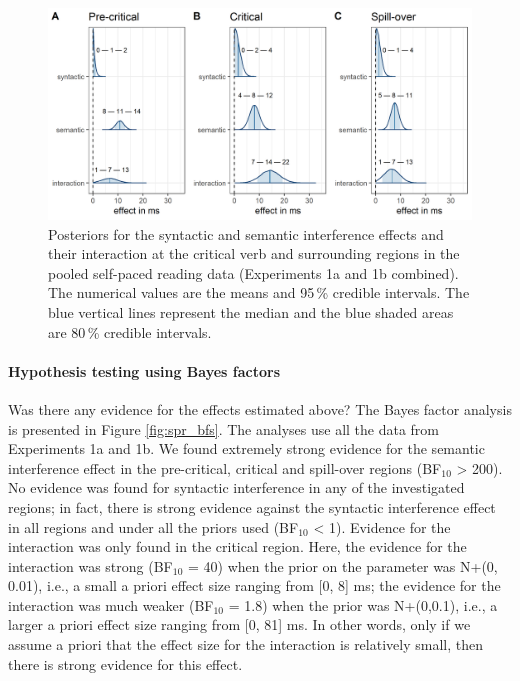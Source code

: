 \documentclass[a4paper, man, floatsintext]{apa7}
\begin{document}
\begin{figure}[H]
    \caption{Posteriors for the syntactic and semantic interference effects and their interaction at the critical verb and surrounding regions in the pooled self-paced reading data (Experiments 1a and 1b combined). The numerical values are the means and 95\,\% credible intervals. The blue vertical lines represent the median and the blue shaded areas are 80\,\% credible intervals.}
    \label{fig:spr_posteriors}
    \centering
    \includegraphics[width=\textwidth]{images/posteriors_spr_pooled_774.png}
\end{figure}

\paragraph{Hypothesis testing using Bayes factors}

Was there any evidence for the effects estimated above? The Bayes factor analysis is presented in Figure \ref{fig:spr_bfs}. The analyses use all the data from Experiments 1a and 1b. We found extremely strong evidence for the semantic interference effect in the pre-critical, critical and spill-over regions (BF$_{10}$ > 200). No evidence was found for syntactic interference in any of the investigated regions; in fact, there is strong evidence against the syntactic interference effect in all regions and under all the priors used (BF$_{10}$ < 1). Evidence for the interaction was only found in the critical region. Here, the evidence for the interaction was strong (BF$_{10}$ = 40) when the prior on the parameter was N+(0, 0.01), i.e., a small a priori effect size ranging from  [0, 8] ms; the evidence for the interaction was much weaker (BF$_{10}$ = 1.8) when the prior was N+(0,0.1), i.e., a larger a priori effect size ranging from [0, 81] ms. In other words, only if we assume a priori that the effect size for the interaction is relatively small, then there is strong evidence for this effect.
\end{document}
